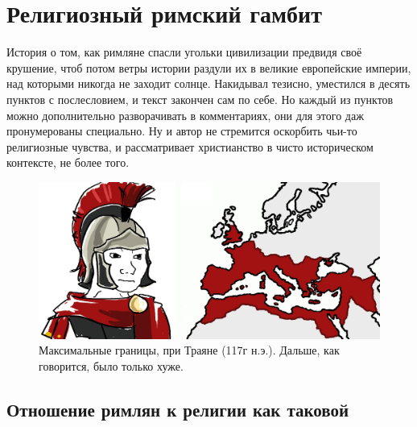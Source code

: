 \chapter{Религиозный римский гамбит}





История о том, как римляне спасли угольки цивилизации предвидя своё крушение, чтоб потом ветры истории раздули их в великие европейские империи, над которыми никогда не заходит солнце. Накидывал тезисно, уместился в десять пунктов с послесловием, и текст закончен сам по себе. Но каждый из пунктов можно дополнительно разворачивать в комментариях, они для этого даж пронумерованы специально. Ну и автор не стремится оскорбить чьи-то религиозные чувства, и рассматривает христианство в чисто историческом контексте, не более того.



\begin{figure}[h!tb]
	\centering\includegraphics[scale=0.3]{Relig_gambit/1572931902173172101.png}
	\caption{Максимальные границы, при Траяне (117г н.э.). Дальше, как говорится, было только хуже.		}
	\label{fig:gambit1} %
	
\end{figure}

\section{Отношение римлян к религии как таковой}

